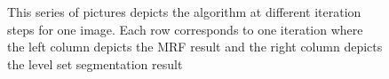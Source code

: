 \documentclass{article} %
\begin{document}
\begin{figure}[htbp]
{}
\caption{This series of pictures depicts the algorithm at different iteration steps for one image. Each row corresponds to one iteration where the left column depicts the MRF result and the right column depicts the level set segmentation result}
\label{Iterations}
\end{figure}
\end{document}
